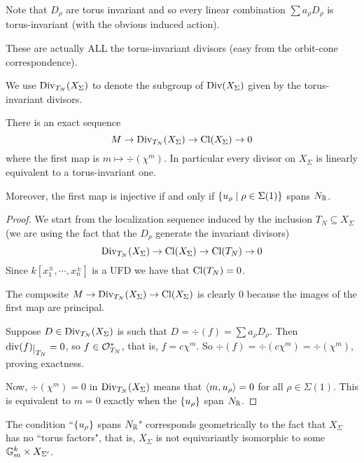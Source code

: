 \begin{remark}
Note that $D_\rho$ are torus invariant and so every linear combination $\sum a_\rho D_\rho$ is torus-invariant (with the obvious induced action).

These are actually ALL the torus-invariant divisors (easy from the orbit-cone correspondence).
\end{remark}


\begin{notation}
We use $\operatorname{Div}_{T_N}(X_\Sigma)$ to denote the subgroup of $\operatorname{Div}(X_\Sigma)$ given by the torus-invariant divisors.
\end{notation}


\begin{proposition}[]\label{PrExactSequenceOfTorusInvariantDivisors}
There is an exact sequence
\[M\to \operatorname{Div}_{T_N}(X_\Sigma)\to \operatorname{Cl}(X_\Sigma)\to 0\]
where the first map is $m\mapsto \div(\chi^m)$. In particular every divisor on $X_\Sigma$ is linearly equivalent to a torus-invariant one.

Moreover, the first map is injective if and only if $\left\{{u_\rho\mid \rho\in \Sigma(1)}\right\}$ spans $N_{\mathbb{R}}$.
\end{proposition}
\begin{proof}
We start from the localization sequence induced by the inclusion $T_N\subseteq X_\Sigma$ (we are using the fact that the $D_\rho$ generate the invariant divisors)
\[\operatorname{Div}_{T_N}(X_\Sigma)\to \operatorname{Cl}(X_\Sigma)\to \operatorname{Cl}(T_N)\to 0\]
Since $k[x_1^{\pm},\cdots, x_n^{\pm}]$ is a UFD we have that $\operatorname{Cl}(T_N)=0$.

The composite $M\to \operatorname{Div}_{T_N}(X_\Sigma)\to \operatorname{Cl}(X_\Sigma)$ is clearly 0 because the images of the first map are principal.

Suppose $D\in \operatorname{Div}_{T_N}(X_\Sigma)$ is such that $D=\div(f)=\sum a_\rho D_\rho$. Then $\div(f)\res{T_N}=0$, so $f\in \mathcal{O}_{T_N}^\ast$, that is, $f=c\chi^m$. So $\div(f)=\div(c\chi^m)=\div(\chi^m)$, proving exactness.


Now, $\div(\chi^m)=0$ in $\operatorname{Div}_{T_N}(X_\Sigma)$ means that $\left\langle {m,u_\rho}\right\rangle=0$ for all $\rho\in \Sigma(1)$. This is equivalent to $m=0$ exactly when the $\left\{{u_\rho}\right\}$ span $N_{\mathbb{R}}$.
\end{proof}

\begin{remark}
The condition ``$\left\{{u_\rho}\right\}$ spans $N_{\mathbb{R}}$" corresponds geometrically to the fact that $X_\Sigma$ has no ``torus factors", that is, $X_\Sigma$ is not equivariantly isomorphic to some $\mathbb{G}_m^k\times X_{\Sigma'}$.
\end{remark}


